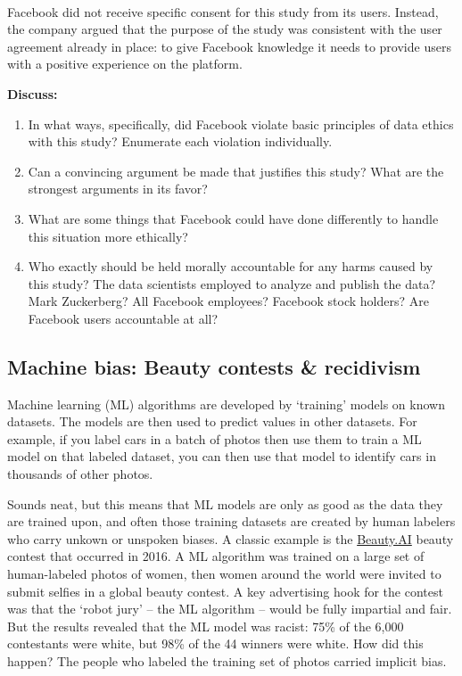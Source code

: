 \documentclass[]{book}
\begin{document}
~

Facebook did not receive specific consent for this study from its users. Instead, the company argued that the purpose of the study was consistent with the user agreement already in place: to give Facebook knowledge it needs to provide users with a positive experience on the platform.

\textbf{Discuss:}

\begin{enumerate}
\def\labelenumi{\arabic{enumi}.}
\item
  In what ways, specifically, did Facebook violate basic principles of data ethics with this study? Enumerate each violation individually.
\item
  Can a convincing argument be made that justifies this study? What are the strongest arguments in its favor?
\item
  What are some things that Facebook could have done differently to handle this situation more ethically?
\item
  Who exactly should be held morally accountable for any harms caused by this study? The data scientists employed to analyze and publish the data? Mark Zuckerberg? All Facebook employees? Facebook stock holders? Are Facebook users accountable at all?
\end{enumerate}

\hypertarget{machine-bias-beauty-contests-recidivism}{%
\subsection*{Machine bias: Beauty contests \& recidivism}\label{machine-bias-beauty-contests-recidivism}}

Machine learning (ML) algorithms are developed by `training' models on known datasets. The models are then used to predict values in other datasets. For example, if you label cars in a batch of photos then use them to train a ML model on that labeled dataset, you can then use that model to identify cars in thousands of other photos.

Sounds neat, but this means that ML models are only as good as the data they are trained upon, and often those training datasets are created by human labelers who carry unkown or unspoken biases. A classic example is the \href{https://www.theguardian.com/technology/2016/sep/08/artificial-intelligence-beauty-contest-doesnt-like-black-people}{Beauty.AI} beauty contest that occurred in 2016. A ML algorithm was trained on a large set of human-labeled photos of women, then women around the world were invited to submit selfies in a global beauty contest. A key advertising hook for the contest was that the `robot jury' -- the ML algorithm -- would be fully impartial and fair. But the results revealed that the ML model was racist: 75\% of the 6,000 contestants were white, but 98\% of the 44 winners were white. How did this happen? The people who labeled the training set of photos carried implicit bias.
\end{document}
